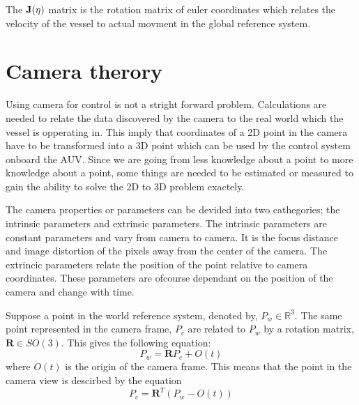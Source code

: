 	The $\mathbf{J}(\mathbf{\eta})$ matrix is the rotation matrix of euler coordinates which relates the velocity of the 
	vessel to actual movment in the global reference system.




\section{Camera therory}
	\label{ch1-cameramodel}
	Using camera for control is not a stright forward problem. Calculations are needed to relate the data discovered 
	by the camera to the real world which the vessel is opperating in. This imply that coordinates of a 2D point in 
	the camera have to be transformed into a 3D point which can be used by the control system onboard the AUV. Since 
	we are going from less knowledge about a point to more knowledge about a point, some things are needed to be 
	estimated or measured to gain the ability to solve the 2D to 3D problem exactely.
	
	The camera properties or parameters can be devided into two cathegories; the intrinsic parameters and extrinsic 
	parameters. The intrinsic parameters are constant parameters and vary from camera to camera. It is the focus 
	distance and image distortion of the pixels away from the center of the camera. The extrincic parameters relate 
	the position of the point relative to camera coordinates. These parameters are ofcourse dependant on the 
	position of the camera and change with time. \cite{robotbok}
	
	
	Suppose a point in the world reference system, denoted by, $P_w \in \mathbb{R}^3$. The same point
	represented in the camera frame, $P_c$ are related to $P_w$ by a rotation matrix, $\mathbf{R} \in
	SO(3)$. This gives the following equation: 
	\begin{equation}
		P_w = \mathbf{R} P_c + O(t)
	\end{equation}
	where $O(t)$ is the origin of the camera frame. This means that the point in the camera view is
	descirbed by the equation
	\begin{equation}
		\label{eq:ch1-P_c}
		P_c = \mathbf{R}^T (P_w - O(t))
	\end{equation}

